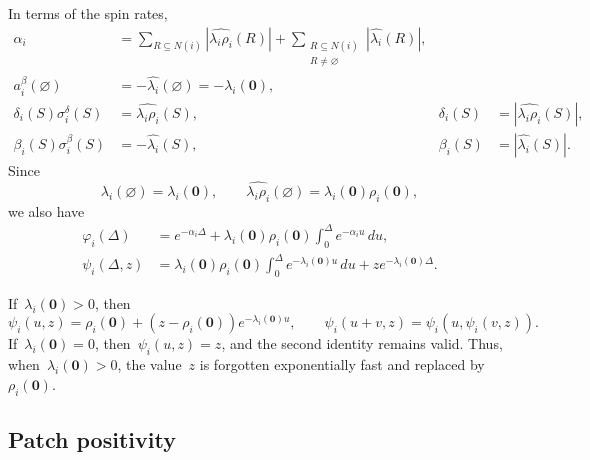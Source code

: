 \documentclass[EJP,preprint,NODS,nobera]{ejpecp}
\newcommand{\R}{\mathbb{R}}
\newcommand{\bb}[1]{\left(#1\right)}
\newcommand{\abs}[1]{\left|#1\right|}
\newcommand{\mb}[1]{\mathbf{#1}}
\newcommand{\chg}[1]{{\color{changegreen}#1}}
\begin{document}
\chg{\begin{remark}
\label{rem:spin-rate-contributions}
In terms of the spin rates,
\begin{equation}
\label{eq:dual-to-spin-contribution-data}
\begin{aligned}
\alpha_i
&=
\sum_{R\subseteq N(i)}\abs{\widehat{\lambda_i\rho_i}(R)}
+
\sum_{\substack{R\subseteq N(i)\\R\neq\varnothing}}
\abs{\widehat{\lambda_i}(R)},
\\
a_i^\beta(\varnothing)
&=
-\widehat{\lambda_i}(\varnothing)
=
-\lambda_i(\mb 0),
\\
\delta_i(S)\sigma_i^\delta(S)
&=
\widehat{\lambda_i\rho_i}(S),
&\delta_i(S)
&=
\abs{\widehat{\lambda_i\rho_i}(S)},
\\
\beta_i(S)\sigma_i^\beta(S)
&=
-\widehat{\lambda_i}(S),
&\beta_i(S)
&=
\abs{\widehat{\lambda_i}(S)}.
\end{aligned}
\end{equation}
Since
\begin{equation*}
\widehat{\lambda_i}(\varnothing)=\lambda_i(\mb 0),
\qquad
\widehat{\lambda_i\rho_i}(\varnothing)
=
\lambda_i(\mb 0)\rho_i(\mb 0),
\end{equation*}
we also have
\begin{align*}
\varphi_i(\Delta)
&=
e^{-\alpha_i\Delta}
+
\lambda_i(\mb 0)\rho_i(\mb 0)
\int_0^\Delta e^{-\alpha_i u}\,du,
\\
\psi_i(\Delta,z)
&=
\lambda_i(\mb 0)\rho_i(\mb 0)
\int_0^\Delta e^{-\lambda_i(\mb 0)u}\,du
+
z e^{-\lambda_i(\mb 0)\Delta}.
\end{align*}

If~$\lambda_i(\mb 0)>0$, then
\begin{equation}
\label{eq:all-zero-neighbourhood-relaxation}
\psi_i(u,z)
=
\rho_i(\mb 0)
+
\bb{z-\rho_i(\mb 0)}e^{-\lambda_i(\mb 0)u},
\qquad
\psi_i(u+v,z)
=
\psi_i\bb{u,\psi_i(v,z)}.
\end{equation}
If~$\lambda_i(\mb 0)=0$, then~$\psi_i(u,z)=z$, and the second identity remains
valid.
Thus, when~$\lambda_i(\mb 0)>0$, the value~$z$ is forgotten exponentially
fast and replaced by~$\rho_i(\mb 0)$.
\end{remark}}

\FloatBarrier

\subsection{Patch positivity}
\label{subsec:proof-patch-positivity-threshold}
\end{document}

